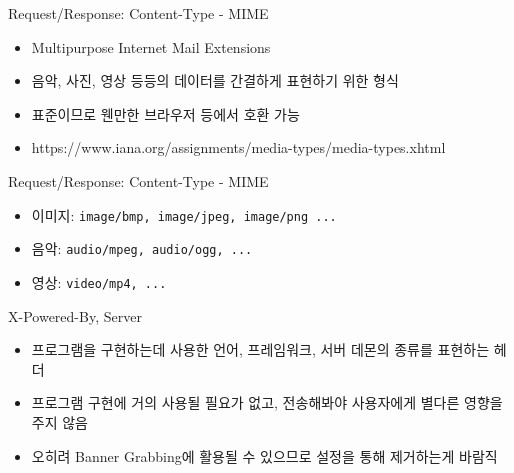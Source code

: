\documentclass{beamer}
\begin{document}
    \begin{frame}{Request/Response: Content-Type - MIME}
        \begin{itemize}
            \item Multipurpose Internet Mail Extensions
            \item 음악, 사진, 영상 등등의 데이터를 간결하게 표현하기 위한 형식
            \item 표준이므로 웬만한 브라우저 등에서 호환 가능
            \item \small{https://www.iana.org/assignments/media-types/media-types.xhtml}
        \end{itemize}
    \end{frame}

    \begin{frame}{Request/Response: Content-Type - MIME}
        \begin{itemize}
            \item 이미지: \texttt{image/bmp, image/jpeg, image/png ...}
            \item 음악: \texttt{audio/mpeg, audio/ogg, ...}
            \item 영상: \texttt{video/mp4, ...}
        \end{itemize}
    \end{frame}

    \begin{frame}{X-Powered-By, Server}
        \begin{itemize}
            \item 프로그램을 구현하는데 사용한 언어, 프레임워크, 서버 데몬의 종류를 표현하는 헤더
            \item 프로그램 구현에 거의 사용될 필요가 없고, 전송해봐야 사용자에게 별다른 영향을 주지 않음
            \item 오히려 Banner Grabbing에 활용될 수 있으므로 설정을 통해 제거하는게 바람직
        \end{itemize}
    \end{frame}
\end{document}
